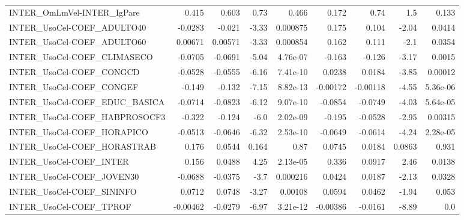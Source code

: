 \begin{tabular}{lrrrrrrrr}
INTER\_OmLmVel-INTER\_IgPare            &       0.415 &        0.603 &     0.73 &    0.466 &      0.172 &        0.74 &          1.5 &         0.133 \\
INTER\_UsoCel-COEF\_ADULTO40            &     -0.0283 &       -0.021 &    -3.33 & 0.000875 &      0.175 &       0.104 &        -2.04 &        0.0414 \\
INTER\_UsoCel-COEF\_ADULTO60            &     0.00671 &      0.00571 &    -3.33 & 0.000854 &      0.162 &       0.111 &         -2.1 &        0.0354 \\
INTER\_UsoCel-COEF\_CLIMASECO           &     -0.0705 &      -0.0691 &    -5.04 & 4.76e-07 &     -0.163 &      -0.126 &        -3.17 &        0.0015 \\
INTER\_UsoCel-COEF\_CONGCD              &     -0.0528 &      -0.0555 &    -6.16 & 7.41e-10 &     0.0238 &      0.0184 &        -3.85 &       0.00012 \\
INTER\_UsoCel-COEF\_CONGEF              &      -0.149 &       -0.132 &    -7.15 & 8.82e-13 &   -0.00172 &    -0.00118 &        -4.55 &      5.36e-06 \\
INTER\_UsoCel-COEF\_EDUC\_BASICA         &     -0.0714 &      -0.0823 &    -6.12 & 9.07e-10 &    -0.0854 &     -0.0749 &        -4.03 &      5.64e-05 \\
INTER\_UsoCel-COEF\_HABPROSOCF3         &      -0.322 &       -0.124 &     -6.0 & 2.02e-09 &     -0.195 &     -0.0528 &        -2.95 &       0.00315 \\
INTER\_UsoCel-COEF\_HORAPICO            &     -0.0513 &      -0.0646 &    -6.32 & 2.53e-10 &    -0.0649 &     -0.0614 &        -4.24 &      2.28e-05 \\
INTER\_UsoCel-COEF\_HORASTRAB           &       0.176 &       0.0544 &    0.164 &     0.87 &     0.0745 &      0.0184 &       0.0863 &         0.931 \\
INTER\_UsoCel-COEF\_INTER               &       0.156 &       0.0488 &     4.25 & 2.13e-05 &      0.336 &      0.0917 &         2.46 &        0.0138 \\
INTER\_UsoCel-COEF\_JOVEN30             &     -0.0688 &      -0.0375 &     -3.7 & 0.000216 &     0.0424 &      0.0187 &        -2.13 &        0.0328 \\
INTER\_UsoCel-COEF\_SININFO             &      0.0712 &       0.0748 &    -3.27 &  0.00108 &     0.0594 &      0.0462 &        -1.94 &         0.053 \\
INTER\_UsoCel-COEF\_TPROF               &    -0.00462 &      -0.0279 &    -6.97 & 3.21e-12 &   -0.00386 &     -0.0161 &        -8.89 &           0.0 \\

\end{tabular}
